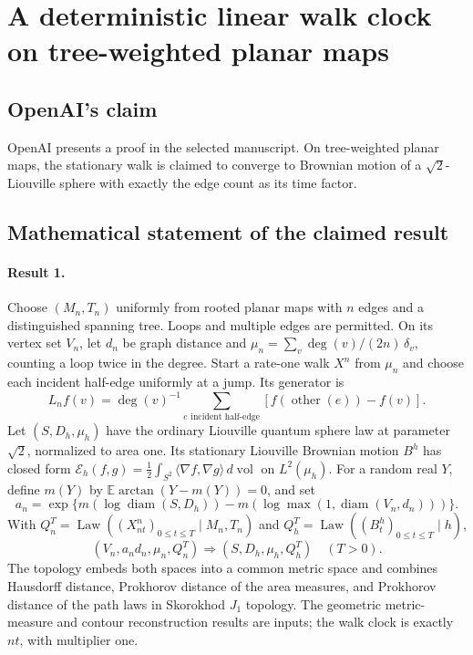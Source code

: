 \documentclass[11pt]{article}
\begin{document}
\section*{A deterministic linear walk clock on tree-weighted planar maps}

\subsection{OpenAI's claim}
OpenAI presents a proof in the selected manuscript. On tree-weighted planar maps, the stationary walk is claimed to converge to Brownian motion of a $\sqrt2$-Liouville sphere with exactly the edge count as its time factor.

\subsection{Mathematical statement of the claimed result}
\paragraph{Result 1.} Choose $(M_n,T_n)$ uniformly from rooted planar maps with $n$ edges and a distinguished spanning tree. Loops and multiple edges are permitted. On its vertex set $V_n$, let $d_n$ be graph distance and $\mu_n=\sum_v\deg(v)/(2n)\,\delta_v$, counting a loop twice in the degree. Start a rate-one walk $X^n$ from $\mu_n$ and choose each incident half-edge uniformly at a jump. Its generator is
\[
 L_nf(v)=\deg(v)^{-1}\sum_{e\text{ incident half-edge}}[f(\operatorname{other}(e))-f(v)].
\]
Let $(S,D_h,\mu_h)$ have the ordinary Liouville quantum sphere law at parameter $\sqrt2$, normalized to area one. Its stationary Liouville Brownian motion $B^h$ has closed form $\mathcal E_h(f,g)=\frac12\int_{S^2}\langle\nabla f,\nabla g\rangle\,d\operatorname{vol}$ on $L^2(\mu_h)$. For a random real $Y$, define $m(Y)$ by $\mathbb E\arctan(Y-m(Y))=0$, and set
\[
 a_n=\exp\{m(\log\operatorname{diam}(S,D_h))-m(\log\max(1,\operatorname{diam}(V_n,d_n)))\}.
\]
With $Q_n^T=\operatorname{Law}((X^n_{nt})_{0\le t\le T}\mid M_n,T_n)$ and $Q_h^T=\operatorname{Law}((B_t^h)_{0\le t\le T}\mid h)$,
\[
 (V_n,a_nd_n,\mu_n,Q_n^T)\Longrightarrow(S,D_h,\mu_h,Q_h^T)\quad(T>0).
\]
The topology embeds both spaces into a common metric space and combines Hausdorff distance, Prokhorov distance of the area measures, and Prokhorov distance of the path laws in Skorokhod $J_1$ topology. The geometric metric-measure and contour reconstruction results are inputs; the walk clock is exactly $nt$, with multiplier one.
\end{document}
